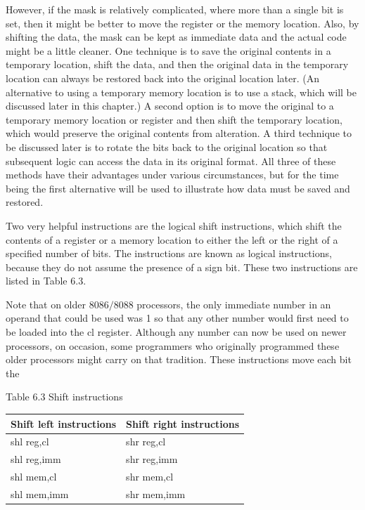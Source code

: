\documentclass[10pt]{article}
\begin{document}
However, if the mask is relatively complicated, where more than a single bit is set, then it might be better to move the register or the memory location. Also, by shifting the data, the mask can be kept as immediate data and the actual code might be a little cleaner. One technique is to save the original contents in a temporary location, shift the data, and then the original data in the temporary location can always be restored back into the original location later. (An alternative to using a temporary memory location is to use a stack, which will be discussed later in this chapter.) A second option is to move the original to a temporary memory location or register and then shift the temporary location, which would preserve the original contents from alteration. A third technique to be discussed later is to rotate the bits back to the original location so that subsequent logic can access the data in its original format. All three of these methods have their advantages under various circumstances, but for the time being the first alternative will be used to illustrate how data must be saved and restored.

Two very helpful instructions are the logical shift instructions, which shift the contents of a register or a memory location to either the left or the right of a specified number of bits. The instructions are known as logical instructions, because they do not assume the presence of a sign bit. These two instructions are listed in Table 6.3.

Note that on older $8086 / 8088$ processors, the only immediate number in an operand that could be used was 1 so that any other number would first need to be loaded into the cl register. Although any number can now be used on newer processors, on occasion, some programmers who originally programmed these older processors might carry on that tradition. These instructions move each bit the

Table 6.3 Shift instructions

\begin{center}
\begin{tabular}{ll}
Shift left instructions & Shift right instructions \\
\hline
shl reg,cl & shr reg,cl \\
shl reg,imm & shr reg,imm \\
shl mem,cl & shr mem,cl \\
shl mem,imm & shr mem,imm \\
\end{tabular}
\end{center}
\end{document}

